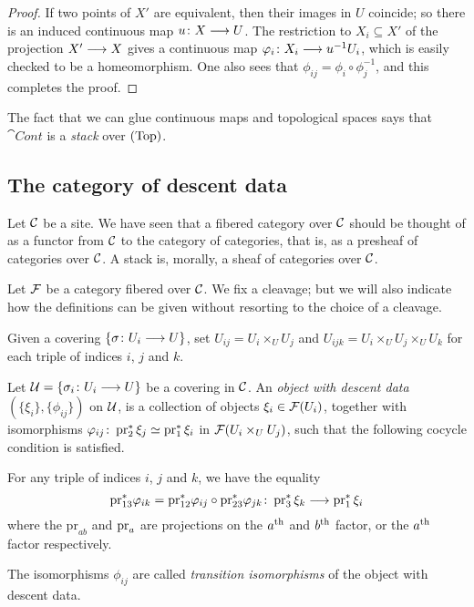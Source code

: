\begin{4   STACKS}
\begin{4.1 Descent of objects of fibcats}
\begin{proof}
If two points of $X'$ are equivalent, then their images in $U$ coincide; so there is an induced continuous map $u \colon X \arr U$. The restriction to $X_i \subseteq X'$ of the projection $X'\arr X$ gives a continuous map $\phi_i \colon X_i \arr u^{-1}U_i$, which is easily checked to be a homeomorphism. One also sees that $\phi_{ij} = \phi_i \circ \phi_j^{-1}$, and this completes the proof.
\end{proof}

The fact that we can glue continuous maps and topological spaces says that $\cat{Cont}$ is a \emph{stack} over $(\mathrm{Top})$.



\subsection{The category of descent data}\label{subsec:descent-data}

Let $\mathcal{C}$ be a site. We have seen that a fibered category over $\mathcal{C}$ should be thought of as a functor from $\mathcal{C}$ to the category of categories, that is, as a presheaf of categories over $\mathcal{C}$. A stack is, morally, a sheaf of categories over $\mathcal{C}$.

Let $\mathcal{F}$ be a category fibered over $\mathcal{C}$. We fix a cleavage; but we will also indicate how the definitions can be given without resorting to the choice of a cleavage.

Given a covering $\{\sigma \colon U_i \arr U\}$, set $U_{ij} = U_i \times_U U_j$ and $U_{ijk} = U_i \times_U U_j \times_U U_k$ for each triple of indices $i$, $j$ and $k$.

\begin{definition}

Let $\cU = \{\sigma_i \colon U_i \arr U\}$ be a covering in $\mathcal{C}$. An \emph{object with descent data} $(\{\xi_i\}, \{\phi_{ij}\})$ on $\mathcal{U}$, is a collection of objects $\xi_i \in \mathcal{F}(U_i)$, together with isomorphisms $\varphi_{ij} \colon \operatorname{pr}_2^* \xi_j \simeq \operatorname{pr}_1^* \xi_i$ in $\mathcal{F}(U_i \times_U U_j)$, such that the following cocycle condition is satisfied.

For any triple of indices $i$, $j$ and $k$, we have the equality
   \[
   \mathrm{pr}_{13}^* \phi_{ik} = \mathrm{pr}_{12}^* \phi_{ij}
   \circ \mathrm{pr}_{23}^* \phi_{jk} \colon \pr_3^*\xi_k
   \arr \pr_1^*\xi_i
   \]
where the $\mathrm{pr}_{ab}$ and $\operatorname{pr}_a$ are projections on the $a^\text{th}$ and $b^\text{th}$ factor, or the $a^\text{th}$ factor respectively.

The isomorphisms $\phi_{ij}$ are called \emph{transition isomorphisms} of the object with descent data.


\end{definition}
\end{4.1 Descent of objects of fibcats}
\end{4   STACKS}
